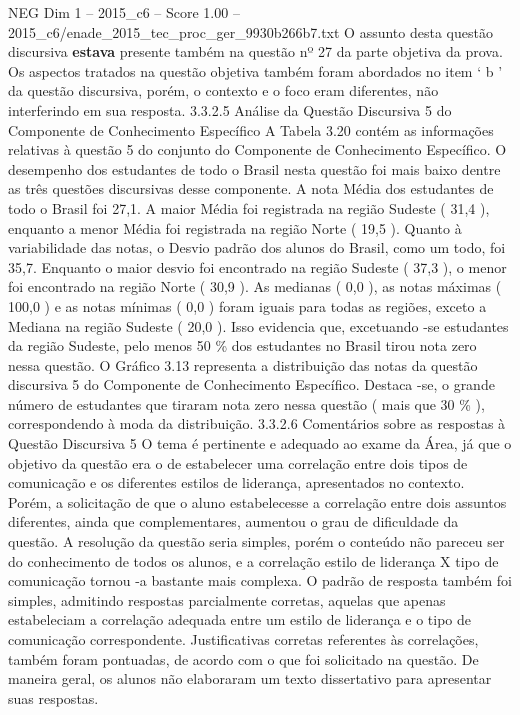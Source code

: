 \begin{textsample}{NEG Dim 1 – 2015\_c6 – Score 1.00 – 2015\_c6/enade\_2015\_tec\_proc\_ger\_9930b266b7.txt}
O assunto desta questão discursiva \textbf{estava} presente também na questão nº 27 da parte objetiva da prova.
Os aspectos tratados na questão objetiva também foram abordados no item ‘ b ’ da questão discursiva, porém, o contexto e o foco eram diferentes, não interferindo em sua resposta. 3.3.2.5 Análise da Questão Discursiva 5 do Componente de Conhecimento Específico A Tabela 3.20 contém as informações relativas à questão 5 do conjunto do Componente de Conhecimento Específico.
O desempenho dos estudantes de todo o Brasil nesta questão foi mais baixo dentre as três questões discursivas desse componente.
A nota Média dos estudantes de todo o Brasil foi 27,1.
A maior Média foi registrada na região Sudeste ( 31,4 ), enquanto a menor Média foi registrada na região Norte ( 19,5 ).
Quanto à variabilidade das notas, o Desvio padrão dos alunos do Brasil, como um todo, foi 35,7.
Enquanto o maior desvio foi encontrado na região Sudeste ( 37,3 ), o menor foi encontrado na região Norte ( 30,9 ).
As medianas ( 0,0 ), as notas máximas ( 100,0 ) e as notas mínimas ( 0,0 ) foram iguais para todas as regiões, exceto a Mediana na região Sudeste ( 20,0 ).
Isso evidencia que, excetuando -se estudantes da região Sudeste, pelo menos 50 \% dos estudantes no Brasil tirou nota zero nessa questão.
O Gráfico 3.13 representa a distribuição das notas da questão discursiva 5 do Componente de Conhecimento Específico.
Destaca -se, o grande número de estudantes que tiraram nota zero nessa questão ( mais que 30 \% ), correspondendo à moda da distribuição. 3.3.2.6 Comentários sobre as respostas à Questão Discursiva 5 O tema é pertinente e adequado ao exame da Área, já que o objetivo da questão era o de estabelecer uma correlação entre dois tipos de comunicação e os diferentes estilos de liderança, apresentados no contexto.
Porém, a solicitação de que o aluno estabelecesse a correlação entre dois assuntos diferentes, ainda que complementares, aumentou o grau de dificuldade da questão.
A resolução da questão seria simples, porém o conteúdo não pareceu ser do conhecimento de todos os alunos, e a correlação estilo de liderança X tipo de comunicação tornou -a bastante mais complexa.
O padrão de resposta também foi simples, admitindo respostas parcialmente corretas, aquelas que apenas estabeleciam a correlação adequada entre um estilo de liderança e o tipo de comunicação correspondente.
Justificativas corretas referentes às correlações, também foram pontuadas, de acordo com o que foi solicitado na questão.
De maneira geral, os alunos não elaboraram um texto dissertativo para apresentar suas respostas.

\end{textsample}
